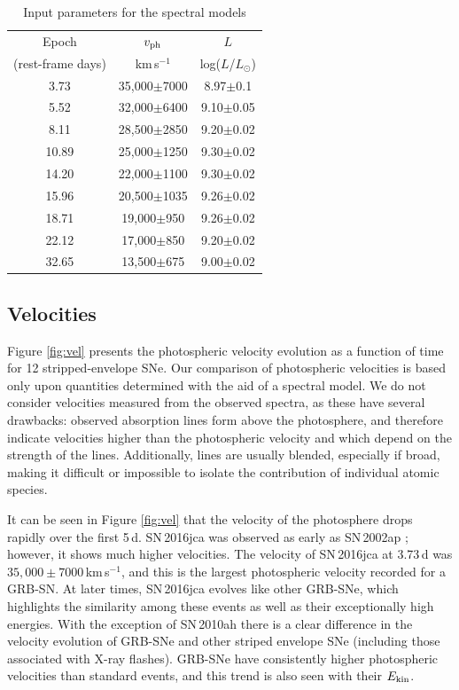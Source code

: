 \documentclass[fleqn,usenatbib]{mnras}
\newcommand{\kms}{km\,s$^{-1}$}
\newcommand{\KE}{$E_{\rm kin}$}
\begin{document}
\begin{table}
 \centering
 \caption{Input parameters for the spectral models }
  \begin{tabular}{ccc}
  \hline
Epoch &   $v_{\rm ph}$   &  $L$   \\
(rest-frame days)& km\,s$^{-1}$& log($L$/$L_{\odot}$) \\
  \hline
  3.73& 35,000$\pm$7000&8.97$\pm$0.1 \\
  5.52& 32,000$\pm$6400&9.10$\pm$0.05 \\
 8.11& 28,500$\pm$2850&9.20$\pm$0.02 \\
10.89& 25,000$\pm$1250&9.30$\pm$0.02 \\
14.20& 22,000$\pm$1100&9.30$\pm$0.02\\
15.96& 20,500$\pm$1035&9.26$\pm$0.02 \\
18.71& 19,000$\pm$950&9.26$\pm$0.02 \\
22.12& 17,000$\pm$850&9.20$\pm$0.02 \\
32.65& 13,500$\pm$675&9.00$\pm$0.02 \\
  \hline
\end{tabular}
\label{table:logofmodel}
\end{table}


\subsection{Velocities}

Figure \ref{fig:vel} presents the photospheric velocity evolution as a function of time for 12 stripped-envelope SNe. Our comparison of photospheric velocities is based only upon quantities determined with the aid of a spectral model.
We do not consider velocities measured from the observed spectra, as these have several drawbacks: observed absorption lines form above the photosphere, and therefore indicate velocities higher than the photospheric velocity and which depend on the strength of the lines. 
Additionally, lines are usually blended, especially if broad, making it difficult or impossible to isolate the contribution of individual atomic species.

It can be seen in Figure \ref{fig:vel} that the velocity of the photosphere drops rapidly over the first 5\,d.  SN\,2016jca was observed as early as SN\,2002ap \citep{Mazzali02}; however,  it shows much higher velocities. The velocity of SN\,2016jca at 3.73\,d was $35,000 \pm 7000$\,\kms, and this is
the largest photospheric velocity recorded for a GRB-SN.
At later times, SN\,2016jca evolves like other GRB-SNe, which highlights the similarity among these events as well as their exceptionally high energies. With the exception of SN\,2010ah there is a clear difference in the 
velocity evolution of GRB-SNe and other striped envelope SNe (including those associated with X-ray flashes).
GRB-SNe have consistently higher photospheric velocities than standard events, and this trend is also seen with their \KE.
\end{document}
